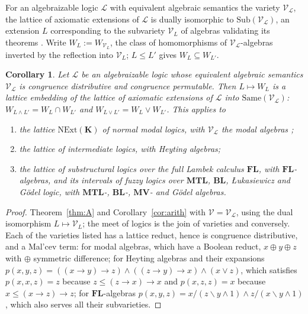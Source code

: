 \documentclass[11pt]{amsart}
\newtheorem{cor}[thm]{Corollary}
\theoremstyle{definition}
\newcommand{\Same}{\mathrm{Same}}
\newcommand{\Sub}{\mathrm{Sub}}
\newcommand{\NExt}{\mathrm{NExt}}
\newcommand{\sV}{\mathcal V}
\begin{document}
For an algebraizable logic $\mathcal L$ with equivalent algebraic semantics the
variety $\sV_{\mathcal L}$, the lattice of axiomatic extensions of $\mathcal L$
is dually isomorphic to $\Sub(\sV_{\mathcal L})$, an extension $L$ corresponding
to the subvariety $\sV_L$ of algebras validating its theorems \cite{BP}. Write
$W_L:=W_{\sV_L}$, the class of homomorphisms of $\sV_{\mathcal L}$-algebras
inverted by the reflection into $\sV_L$; $L\le L'$ gives $W_L\subseteq W_{L'}$.

\begin{cor}\label{cor:logics}
Let $\mathcal L$ be an algebraizable logic whose equivalent algebraic semantics
$\sV_{\mathcal L}$ is congruence distributive and congruence permutable. Then
$L\mapsto W_L$ is a lattice embedding of the lattice of axiomatic extensions of
$\mathcal L$ into $\Same(\sV_{\mathcal L})$: $W_{L\wedge L'}=W_L\cap W_{L'}$ and
$W_{L\vee L'}=W_L\vee W_{L'}$. This applies to
\begin{enumerate}
\item the lattice $\NExt(\mathbf K)$ of normal modal logics, with
$\sV_{\mathcal L}$ the modal algebras \cite{CZ};
\item the lattice of intermediate logics, with Heyting algebras;
\item the lattice of substructural logics over the full Lambek calculus
$\mathbf{FL}$, with $\mathbf{FL}$-algebras, and its intervals of fuzzy logics
over $\mathbf{MTL}$, $\mathbf{BL}$, \L{}ukasiewicz and G\"odel logic, with
$\mathbf{MTL}$-, $\mathbf{BL}$-, $\mathbf{MV}$- and Gödel algebras.
\end{enumerate}
\end{cor}
\begin{proof}
Theorem~\ref{thm:A} and Corollary~\ref{cor:arith} with $\sV=\sV_{\mathcal L}$, using the
dual isomorphism $L\mapsto\sV_L$; the meet of logics is the join of varieties
and conversely. Each of the varieties listed has a lattice reduct, hence is
congruence distributive, and a Mal'cev term: for modal algebras, which have a
Boolean reduct, $x\oplus y\oplus z$ with $\oplus$ symmetric difference; for
Heyting algebras and their expansions
$p(x,y,z)=((x\to y)\to z)\wedge((z\to y)\to x)\wedge(x\vee z)$, which
satisfies $p(x,x,z)=z$ because $z\le(z\to x)\to x$ and
$p(x,z,z)=x$ because $x\le(x\to z)\to z$; for
$\mathbf{FL}$-algebras $p(x,y,z)=x/(z\backslash y\wedge 1)\wedge z/(x\backslash
y\wedge 1)$ \cite{JT,BT,GJKO}, which also serves all their subvarieties.
\end{proof}
\end{document}
